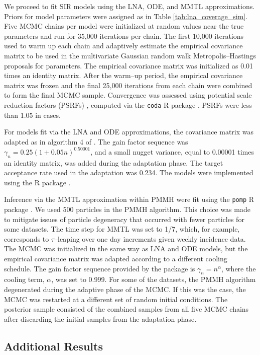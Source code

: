 We proceed to fit SIR models using the LNA, ODE, and MMTL approximations. Priors for model parameters were assigned as in Table \ref{tab:lna_coverage_sim}. Five MCMC chains per model were initialized at random values near the true parameters and run for 35,000 iterations per chain. The first 10,000 iterations used to warm up each chain and adaptively estimate the empirical covariance matrix to be used in the multivariate Gaussian random walk Metropolis--Hastings proposals for parameters. The empirical covariance matrix was initialized as 0.01 times an identity matrix. After the warm--up period, the empirical covariance matrix was frozen and the final 25,000 iterations from each chain were combined to form the final MCMC sample. Convergence was assessed using potential scale reduction factors (PSRFs) \cite{brooks1998general}, computed via the \texttt{coda} R package \cite{codapackage}. PSRFs were less than 1.05 in cases.

For models fit via the LNA and ODE approximations, the covariance matrix was adapted as in algorithm 4 of \cite{andrieu2008tutorial}. The gain factor sequence was $\gamma_n = 0.25(1 + 0.05n)^{0.50001}$, and a small nugget variance, equal to 0.00001 times an identity matrix, was added during the adaptation phase. The target acceptance rate used in the adaptation was 0.234. The models were implemented using the  R package \cite{stemr}.

Inference via the MMTL approximation within PMMH were fit using the \texttt{pomp} R package \cite{pompjss}. We used 500 particles in the PMMH algorithm. This choice was made to mitigate issues of particle degeneracy that occurred with fewer particles for some datasets. The time step for MMTL was set to 1/7, which, for example, corresponds to $ \tau $--leaping over one day increments given weekly incidence data. The MCMC was initialized in the same way as LNA and ODE models, but the empirical covariance matrix was adapted according to a different cooling schedule. The gain factor sequence provided by the package is $ \gamma_n = n^\alpha $, where the cooling term, $ \alpha $, was set to 0.999. For some of the datasets, the PMMH algorithm degenerated during the adaptive phase of the MCMC. If this was the case, the MCMC was restarted at a different set of random initial conditions. The posterior sample consisted of the combined samples from all five MCMC chains after discarding the initial samples from the adaptation phase.

\subsection{Additional Results}
\label{subsec:lna_coverage_additional_results}

